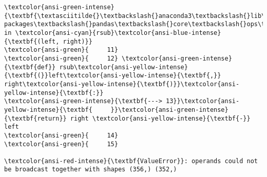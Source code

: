 \documentclass[11pt]{article}
\begin{document}
\begin{Verbatim}[commandchars=\\\{\}, frame=single, framerule=2mm, rulecolor=\color{outerrorbackground}]
\textcolor{ansi-green-intense}{\textbf{\textasciitilde{}\textbackslash{}anaconda3\textbackslash{}lib\textbackslash{}site-packages\textbackslash{}pandas\textbackslash{}core\textbackslash{}ops\textbackslash{}roperator.py}} in \textcolor{ansi-cyan}{rsub}\textcolor{ansi-blue-intense}{\textbf{(left, right)}}
\textcolor{ansi-green}{     11} 
\textcolor{ansi-green}{     12} \textcolor{ansi-green-intense}{\textbf{def}} rsub\textcolor{ansi-yellow-intense}{\textbf{(}}left\textcolor{ansi-yellow-intense}{\textbf{,}} right\textcolor{ansi-yellow-intense}{\textbf{)}}\textcolor{ansi-yellow-intense}{\textbf{:}}
\textcolor{ansi-green-intense}{\textbf{---> 13}}\textcolor{ansi-yellow-intense}{\textbf{     }}\textcolor{ansi-green-intense}{\textbf{return}} right \textcolor{ansi-yellow-intense}{\textbf{-}} left
\textcolor{ansi-green}{     14} 
\textcolor{ansi-green}{     15} 

\textcolor{ansi-red-intense}{\textbf{ValueError}}: operands could not be broadcast together with shapes (356,) (352,) 
    \end{Verbatim}
\end{document}
